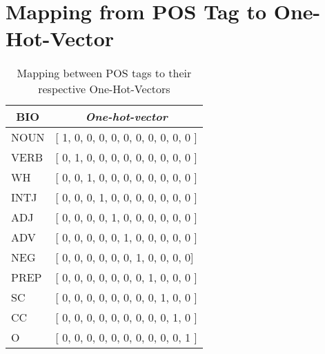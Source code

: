 \section{Mapping from POS Tag to One-Hot-Vector}
\begin{table}
	\centering
	\caption{Mapping between POS tags to their respective One-Hot-Vectors}
	\label{table:onehotpos}
	\begin{tabular}{|l|l|}
		\hline
		\multicolumn{1}{|c|}{BIO} & \multicolumn{1}{c|}{\textit{One-hot-vector}} \\ \hline
		NOUN 				& {[} 1, 0, 0, 0, 0, 0, 0, 0, 0, 0, 0 {]} \\ \hline
		VERB					& {[} 0, 1, 0, 0, 0, 0, 0, 0, 0, 0, 0 {]} \\ \hline
		WH			 		& {[} 0, 0, 1, 0, 0, 0, 0, 0, 0, 0, 0 {]} \\ \hline
		INTJ				& {[} 0, 0, 0, 1, 0, 0, 0, 0, 0, 0, 0 {]} \\ \hline
		ADJ					& {[} 0, 0, 0, 0, 1, 0, 0, 0, 0, 0, 0 {]} \\ \hline
		ADV					 & {[} 0, 0, 0, 0, 0, 1, 0, 0, 0, 0, 0 {]} \\ \hline
		NEG		 			& {[} 0, 0, 0, 0, 0, 0, 1, 0, 0, 0, 0{]} \\ \hline
		PREP 	& {[} 0, 0, 0, 0, 0, 0, 0, 1, 0, 0, 0 {]} \\ \hline
		SC 	& {[} 0, 0, 0, 0, 0, 0, 0, 0, 1, 0, 0 {]} \\ \hline
		CC 		& {[} 0, 0, 0, 0, 0, 0, 0, 0, 0, 1, 0 {]} \\ \hline
		O		 & {[} 0, 0, 0, 0, 0, 0, 0, 0, 0, 0, 1 {]} \\ \hline
	\end{tabular}
\end{table}